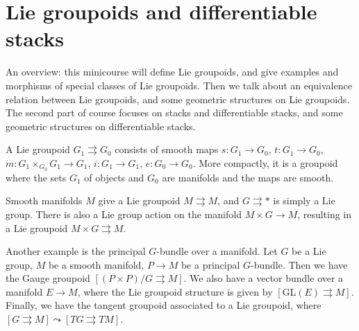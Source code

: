 \section{Lie groupoids and differentiable stacks} 
An overview: this minicourse will define Lie groupoids, and give examples and morphisms of special classes of Lie groupoids. Then we talk about an equivalence relation between Lie groupoids, and some geometric structures on Lie groupoids. The second part of course focuses on stacks and differentiable stacks, and some geometric structures on differentiable stacks.

\begin{definition}[]
    A Lie groupoid $G_1 \rightrightarrows G_0$ consists of smooth maps $s \colon G_1 \to G_0$, $t \colon G_1 \to G_0$, $m \colon G_1 \times _{G_0} G_1\to G_1$, $i \colon G_1 \to G_1$, $e \colon G_0 \to G_0$. More compactly, it is a groupoid where the sets $G_1$ of objects and $G_0$ are manifolds and the maps are smooth.
\end{definition}
\begin{example}
    Smooth manifolds $M$ give a Lie groupoid $M \rightrightarrows M$, and $G \rightrightarrows *$ is simply a Lie group. There is also a Lie group action on the manifold  $M \times G \to M$, resulting in a Lie groupoid $M \times G \rightrightarrows M$. 
\end{example}
\begin{example}
    Another example is the principal $G$-bundle over a manifold. Let $G$ be a Lie group, $M$ be a smooth manifold, $P \to M$ be a principal $G$-bundle. Then we have the Gauge groupoid $[ (P \times P) / G \rightrightarrows M]$. We also have a vector bundle over a manifold $E \to M$, where the Lie groupoid structure is given by $[\mathrm{GL}(E) \rightrightarrows M]$. Finally, we have the tangent groupoid associated to a Lie groupoid, where $[G \rightrightarrows M] \leadsto [TG \rightrightarrows TM]$.
\end{example}


